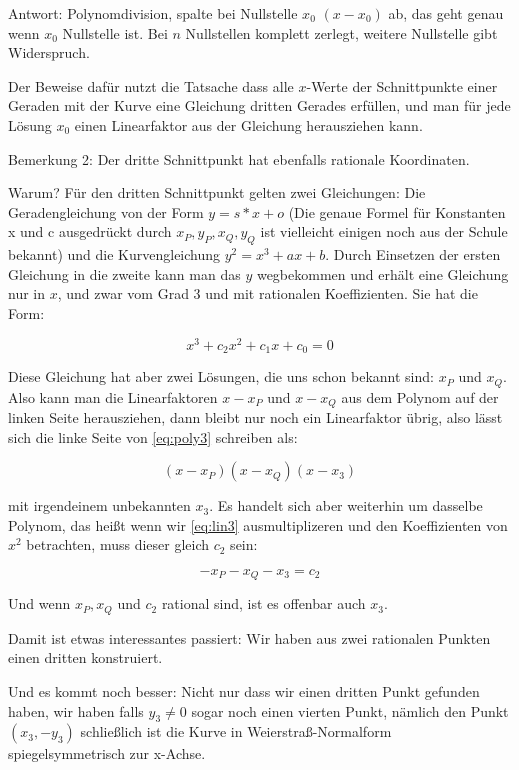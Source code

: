\documentclass{article}
\begin{document}
Antwort: Polynomdivision, spalte bei Nullstelle $x_0$ $(x - x_0)$ ab, das
geht genau wenn $x_0$ Nullstelle ist. Bei $n$ Nullstellen komplett zerlegt,
weitere Nullstelle gibt Widerspruch.

Der Beweise dafür nutzt die Tatsache dass alle $x$-Werte der Schnittpunkte einer
Geraden mit der Kurve eine Gleichung dritten Gerades erfüllen, und man für
jede Lösung $x_0$ einen Linearfaktor aus der Gleichung herausziehen kann.

Bemerkung 2: Der dritte Schnittpunkt hat ebenfalls rationale Koordinaten.

Warum? Für den dritten Schnittpunkt gelten zwei Gleichungen: Die
Geradengleichung von der Form $y = s * x + o$ (Die genaue Formel für Konstanten
x und c ausgedrückt durch $x_P, y_P, x_Q, y_Q$ ist vielleicht einigen noch aus der
Schule bekannt) und die Kurvengleichung $y^2 = x^3 + ax + b$. Durch Einsetzen
der ersten Gleichung in die zweite kann man das $y$ wegbekommen und erhält eine
Gleichung nur in $x$, und zwar vom Grad 3 und mit rationalen Koeffizienten. Sie
hat die Form:

\begin{equation} \label{eq:poly3}
  x^3 + c_2 x^2 + c_1 x + c_0 = 0
\end{equation}

Diese Gleichung hat aber zwei Lösungen, die uns schon bekannt sind: $x_P$ und
$x_Q$. Also kann man die Linearfaktoren $x - x_P$ und $x - x_Q$ aus dem
Polynom auf der linken Seite herausziehen, dann bleibt nur noch ein
Linearfaktor übrig, also lässt sich die linke Seite von \eqref{eq:poly3}
schreiben als:

\begin{equation} \label{eq:lin3}
  (x - x_P) (x - x_Q) (x - x_3)
\end{equation}

mit irgendeinem unbekannten $x_3$. Es handelt sich aber weiterhin um dasselbe
Polynom, das heißt wenn wir \eqref{eq:lin3} ausmultiplizeren und den
Koeffizienten von $x^2$ betrachten, muss dieser gleich $c_2$ sein:

\begin{equation}
  - x_P - x_Q - x_3 = c_2
\end{equation}

Und wenn $x_P, x_Q$ und $c_2$ rational sind, ist es offenbar auch $x_3$.

Damit ist etwas interessantes passiert: Wir haben aus zwei rationalen Punkten
einen dritten konstruiert.

Und es kommt noch besser: Nicht nur dass wir einen dritten Punkt gefunden
haben, wir haben falls $y_3 \ne 0$ sogar noch einen vierten Punkt, nämlich den
Punkt $(x_3, -y_3)$ schließlich ist die Kurve in Weierstraß-Normalform
spiegelsymmetrisch zur x-Achse.
\end{document}
